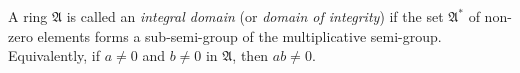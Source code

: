 A ring $\mathfrak{A}$ is called an \emph{integral domain} (or \emph{domain of integrity}) if the set $\mathfrak{A}^*$ of non-zero elements forms a sub-semi-group of the multiplicative semi-group. Equivalently, if $a \neq 0$ and $b \neq 0$ in $\mathfrak{A}$, then $ab \neq 0$.
